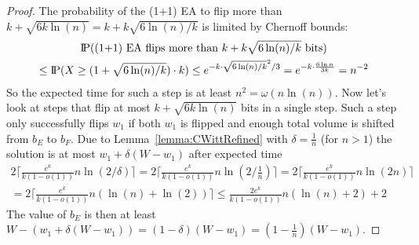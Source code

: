 \begin{proof}




    The probability of the (1+1) EA to flip more than $k+\sqrt{6k\ln(n)}=k+k\sqrt{6\ln(n)/k}$ is limited by Chernoff bounds:
    \begin{gather}
        \nonumber \text{I\kern-0.15em P}(\text{(1+1) EA flips more than }k+k\sqrt{6\ln(n)/k}\text{ bits})\\ \nonumber
        \le\text{I\kern-0.15em P}(X\ge (1+\sqrt{6\ln(n)/k})\cdot k)
        \le e^{-k\cdot{\sqrt{6\ln(n)/k}}^2/3}
        = e^{-k\cdot \frac{6\ln n}{3k}}
        = n^{-2}
    \end{gather}
    So the expected time for such a step is at least \(n^2=\omega(n\ln(n))\).
    Now let's look at steps that flip at most $k+\sqrt{6k\ln(n)}$ bits in a single step.
    Such a step only successfully flips $w_1$ if both $w_1$ is flipped and enough total volume is shifted from $b_E$ to $b_F$.
    Due to Lemma~\ref{lemma:CWittRefined} with $\delta=\frac{1}{n}$ (for $n>1$) the solution is at most $w_1+\delta(W-w_1)$ after expected time
    \begin{gather}\nonumber
        2\lceil\frac{e^k}{k(1-o(1))}n\ln(2/\delta)\rceil
        =2\lceil\frac{e^k}{k(1-o(1))}n\ln(2/\frac{1}{n})\rceil
        =2\lceil\frac{e^k}{k(1-o(1))}n\ln(2n)\rceil \\ \nonumber
        =2\lceil\frac{e^k}{k(1-o(1))}n(\ln(n)+\ln(2))\rceil
        \le\frac{2e^k}{k(1-o(1))}n(\ln(n)+2)+2
    \end{gather}
    The value of $b_E$ is then at least \(W-(w_1+\delta(W-w_1))=(1-\delta)(W-w_1)=(1-\frac{1}{n})(W-w_1)\).


\end{proof}
